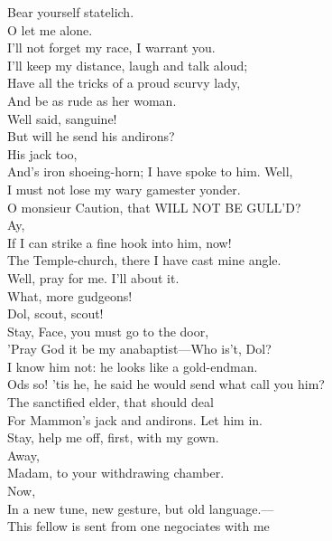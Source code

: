 \documentclass[a4paper,oneside]{memoir}
\begin{document}
\begin{drama*}
Bear yourself statelich.\\
\dolspeaks {} O let me alone.\\
I'll not forget my race, I warrant you.\\
I'll keep my distance, laugh and talk aloud;\\
Have all the tricks of a proud scurvy lady,\\
And be as rude as her woman.\\
\facespeaks {} Well said, sanguine!\\
\subtlespeaks But will he send his andirons?\\
\facespeaks {} His jack too,\\
And's iron shoeing-horn; I have spoke to him. Well,\\
I must not lose my wary gamester yonder.\\
\subtlespeaks O monsieur Caution, that WILL NOT BE GULL'D?\\
\facespeaks Ay,\\
If I can strike a fine hook into him, now!\\
The Temple-church, there I have cast mine angle.\\
Well, pray for me. I'll about it.\\
\subtlespeaks {} What, more gudgeons!\\
Dol, scout, scout!\\
Stay, Face, you must go to the door,\\
'Pray God it be my anabaptist---Who is't, Dol?\\
\dolspeaks I know him not: he looks like a gold-endman.\\
\subtlespeaks Ods so! 'tis he, he said he would send what call you him?\\
The sanctified elder, that should deal\\
For Mammon's jack and andirons. Let him in.\\
Stay, help me off, first, with my gown.\\
Away,\\
Madam, to your withdrawing chamber.\\
Now,\\
In a new tune, new gesture, but old language.---\\
This fellow is sent from one negociates with me\\

\end{drama*}
\end{document}
